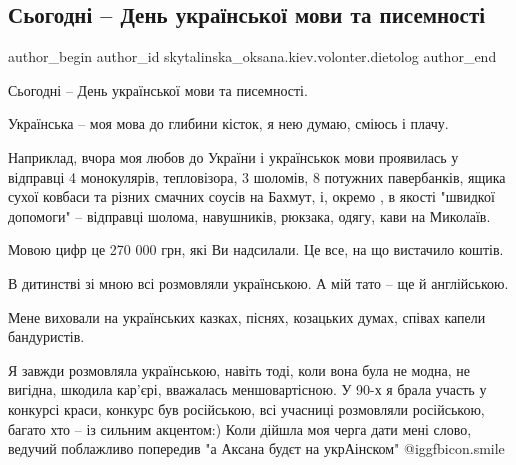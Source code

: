  
 
 
 
 
 
\subsection{Сьогодні -- День української мови та писемності}
\label{sec:09_11_2022.fb.skytalinska_oksana.kiev.volonter.dietolog.1.den_ukrmovy}
 
\ifcmt
 author_begin
   author_id skytalinska_oksana.kiev.volonter.dietolog
 author_end
\fi

Сьогодні -- День української мови та писемності.

Українська -- моя мова до глибини кісток, я нею думаю, сміюсь і плачу.

Наприклад, вчора моя любов до України і українськок мови проявилась у відправці
4 монокулярів, тепловізора, 3 шоломів, 8 потужних павербанків, ящика сухої
ковбаси та різних смачних соусів на Бахмут, і, окремо , в якості "швидкої
допомоги" -- відправці шолома, навушників, рюкзака, одягу, кави на Миколаїв. 

Мовою цифр це 270 000 грн, які Ви надсилали.  Це все, на що вистачило коштів.

В дитинстві зі мною всі розмовляли українською. А мій тато -- ще й англійською.

Мене виховали на українських казках, піснях, козацьких думах, співах капели
бандуристів.

Я завжди розмовляла українською, навіть тоді, коли вона була не модна, не
вигідна, шкодила кар'єрі,  вважалась меншовартісною. У 90-х я брала участь у
конкурсі краси, конкурс був російською, всі учасниці розмовляли російською,
багато хто -- із сильним акцентом:) Коли дійшла моя черга дати мені слово,
ведучий поблажливо попередив "а Аксана будєт на укрАінском" @igg{fbicon.smile} 

